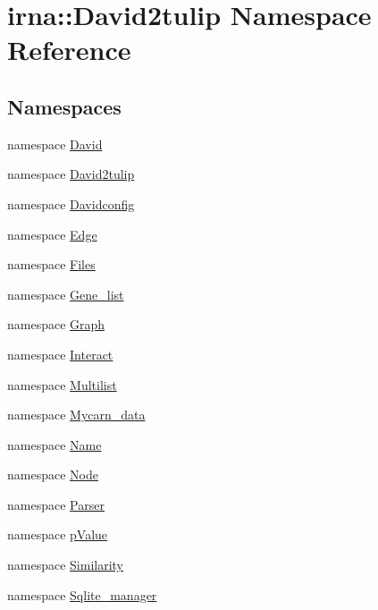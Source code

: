 \hypertarget{namespaceirna_1_1David2tulip}{
\section{irna\-:\-:\-David2tulip \-Namespace \-Reference}
\label{namespaceirna_1_1David2tulip}
}
\subsection*{\-Namespaces}
\begin{DoxyCompactItemize}
\item 
namespace \hyperlink{namespaceirna_1_1David2tulip_1_1David}{\-David}
\item 
namespace \hyperlink{namespaceirna_1_1David2tulip_1_1David2tulip}{\-David2tulip}
\item 
namespace \hyperlink{namespaceirna_1_1David2tulip_1_1Davidconfig}{\-Davidconfig}
\item 
namespace \hyperlink{namespaceirna_1_1David2tulip_1_1Edge}{\-Edge}
\item 
namespace \hyperlink{namespaceirna_1_1David2tulip_1_1Files}{\-Files}
\item 
namespace \hyperlink{namespaceirna_1_1David2tulip_1_1Gene__list}{\-Gene\-\_\-list}
\item 
namespace \hyperlink{namespaceirna_1_1David2tulip_1_1Graph}{\-Graph}
\item 
namespace \hyperlink{namespaceirna_1_1David2tulip_1_1Interact}{\-Interact}
\item 
namespace \hyperlink{namespaceirna_1_1David2tulip_1_1Multilist}{\-Multilist}
\item 
namespace \hyperlink{namespaceirna_1_1David2tulip_1_1Mycarn__data}{\-Mycarn\-\_\-data}
\item 
namespace \hyperlink{namespaceirna_1_1David2tulip_1_1Name}{\-Name}
\item 
namespace \hyperlink{namespaceirna_1_1David2tulip_1_1Node}{\-Node}
\item 
namespace \hyperlink{namespaceirna_1_1David2tulip_1_1Parser}{\-Parser}
\item 
namespace \hyperlink{namespaceirna_1_1David2tulip_1_1pValue}{p\-Value}
\item 
namespace \hyperlink{namespaceirna_1_1David2tulip_1_1Similarity}{\-Similarity}
\item 
namespace \hyperlink{namespaceirna_1_1David2tulip_1_1Sqlite__manager}{\-Sqlite\-\_\-manager}
\end{DoxyCompactItemize}
